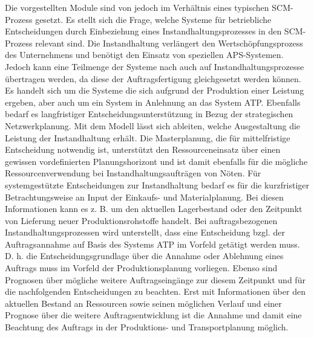 Die vorgestellten Module sind von \cite{meyr2015structure} jedoch im Verhältnis eines typischen SCM-Prozess gesetzt. Es stellt sich die Frage, welche Systeme für betriebliche Entscheidungen durch Einbeziehung eines Instandhaltungsprozesses in den SCM-Prozess relevant sind. Die Instandhaltung verlängert den Wertschöpfungsprozess des Unternehmens und benötigt den Einsatz von speziellen APS-Systemen. Jedoch kann eine Teilmenge der Systeme nach \cite{meyr2015structure} auch auf Instandhaltungsprozesse übertragen werden, da diese der Auftragsfertigung gleichgesetzt werden können. Es handelt sich um die Systeme die sich aufgrund der Produktion einer Leistung ergeben, aber auch um ein System in Anlehnung an das System ATP. Ebenfalls bedarf es langfristiger Entscheidungsunterstützung in Bezug der strategischen Netzwerkplanung. Mit dem Modell lässt sich ableiten, welche Ausgestaltung die Leistung der Instandhaltung erhält. Die Masterplanung, die für mittelfristige Entscheidung notwendig ist, unterstützt den Ressourceneinsatz über einen gewissen vordefinierten Planungshorizont und ist damit ebenfalls für die mögliche Ressourcenverwendung bei Instandhaltungsaufträgen von Nöten. Für systemgestützte Entscheidungen zur Instandhaltung bedarf es für die kurzfristiger Betrachtungsweise an Input der Einkaufs- und Materialplanung. Bei diesen Informationen kann es z. B. um den aktuellen Lagerbestand oder den Zeitpunkt von Lieferung neuer Produktionsrohstoffe handelt. Bei auftragsbezogenen Instandhaltungsprozessen wird unterstellt, dass eine Entscheidung bzgl. der Auftragsannahme auf Basis des Systems ATP im Vorfeld getätigt werden muss. D. h. die Entscheidungsgrundlage über die Annahme oder Ablehnung eines Auftrags muss im Vorfeld der Produktionsplanung vorliegen. Ebenso sind Prognosen über mögliche weitere Auftragseingänge zur diesem Zeitpunkt und für die nachfolgenden Entscheidungen zu beachten. Erst mit Informationen über den aktuellen Bestand an Ressourcen sowie seinen möglichen Verlauf und einer Prognose über die weitere Auftragsentwicklung  ist die Annahme und damit eine Beachtung des Auftrags in der Produktions- und Transportplanung möglich.


